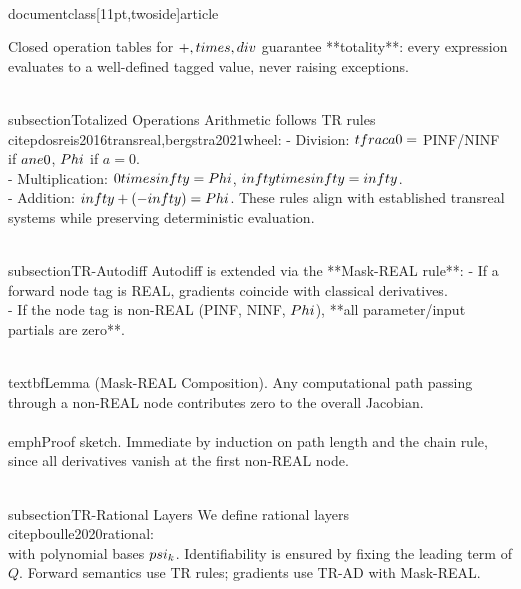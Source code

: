 \\documentclass[11pt,twoside]{article}
\begin{document}
Closed operation tables for $+, \\times, \\div$ guarantee **totality**: every expression evaluates to a well-defined tagged value, never raising exceptions.

\\subsection{Totalized Operations}
Arithmetic follows TR rules \\citep{dosreis2016transreal,bergstra2021wheel}:
- Division: $\\tfrac{a}{0} =$ PINF/NINF if $a \\ne 0$, $\\Phi$ if $a=0$.  \\
- Multiplication: $0 \\times \\infty = \\Phi$, $\\infty \\times \\infty = \\infty$.  \\
- Addition: $\\infty + (-\\infty) = \\Phi$.  
These rules align with established transreal systems while preserving deterministic evaluation.

\\subsection{TR-Autodiff}
Autodiff is extended via the **Mask-REAL rule**:
- If a forward node tag is REAL, gradients coincide with classical derivatives.  \\
- If the node tag is non-REAL (PINF, NINF, $\\Phi$), **all parameter/input partials are zero**.  

\\textbf{Lemma (Mask-REAL Composition).} Any computational path passing through a non-REAL node contributes zero to the overall Jacobian.  \\
\\emph{Proof sketch.} Immediate by induction on path length and the chain rule, since all derivatives vanish at the first non-REAL node.

\\subsection{TR-Rational Layers}
We define rational layers \\citep{boulle2020rational}:
\\[
y(x) = \\frac{P_\\theta(x)}{Q_\\phi(x)}, \\quad 
Q_\\phi(x) = 1 + \\sum_{k=1}^{d_Q} \\phi_k \\psi_k(x),
\\]
with polynomial bases $\\psi_k$. Identifiability is ensured by fixing the leading term of $Q$. Forward semantics use TR rules; gradients use TR-AD with Mask-REAL.
\end{document}
